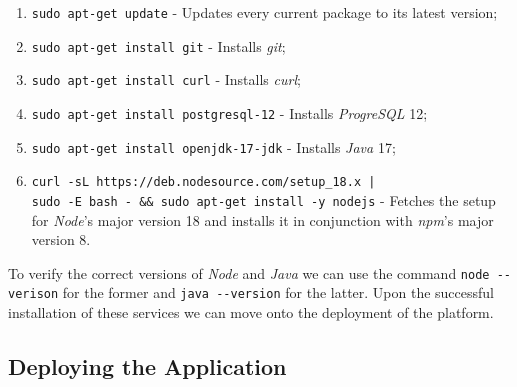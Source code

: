 \begin{enumerate}
    \item \lstinline[keywordstyle=\color{black},commentstyle=\color{black},stringstyle=\color{black}]{sudo apt-get update} - Updates every current package to its latest version;
    \item \lstinline[keywordstyle=\color{black},commentstyle=\color{black},stringstyle=\color{black}]{sudo apt-get install git} - Installs \textit{git};
    \item \lstinline[keywordstyle=\color{black},commentstyle=\color{black},stringstyle=\color{black}]{sudo apt-get install curl} - Installs \textit{curl};
    \item \lstinline[keywordstyle=\color{black},commentstyle=\color{black},stringstyle=\color{black}]{sudo apt-get install postgresql-12} - Installs \textit{ProgreSQL} 12;
    \item \lstinline[keywordstyle=\color{black},commentstyle=\color{black},stringstyle=\color{black}]{sudo apt-get install openjdk-17-jdk} - Installs \textit{Java} 17;
    \item \lstinline[keywordstyle=\color{black},commentstyle=\color{black},stringstyle=\color{black}]{curl -sL https://deb.nodesource.com/setup_18.x |}\\
    \lstinline[keywordstyle=\color{black},commentstyle=\color{black},stringstyle=\color{black}]{sudo -E bash - && sudo apt-get install -y nodejs} - Fetches the setup for \textit{Node}'s major version 18 and installs it in conjunction with \textit{npm}'s major version 8.
\end{enumerate}

To verify the correct versions of \textit{Node} and \textit{Java} we can use the command \lstinline[keywordstyle=\color{black},commentstyle=\color{black},stringstyle=\color{black}]{node --verison} for the former and \lstinline[keywordstyle=\color{black},commentstyle=\color{black},stringstyle=\color{black}]{java --version} for the latter.
Upon the successful installation of these services we can move onto the deployment of the platform.

\subsection{Deploying the Application}~\label{ch:impl:sec:install-deploy:ss:on-premises:ss:deploy-app}

